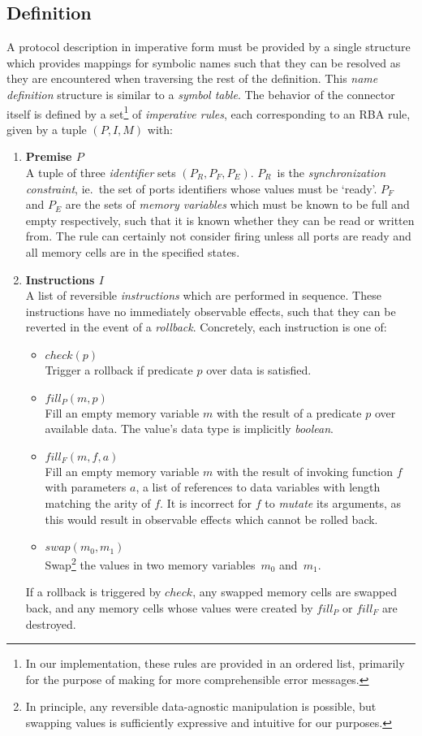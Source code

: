 \subsection{Definition}
\label{sec:imperative_form_definition}
A protocol description in imperative form must be provided by a single structure which provides mappings for symbolic names such that they can be resolved as they are encountered when traversing the rest of the definition. This \textit{name definition} structure is similar to a \textit{symbol table}. The behavior of the connector itself is defined by a set\footnote{In our implementation, these rules are provided in an ordered list, primarily for the purpose of making for more comprehensible error messages.} of \textit{imperative rules}, each corresponding to an RBA rule, given by a tuple $(P, I, M)$ with:
\begin{enumerate}
	\item \textbf{Premise $P$}\\
	A tuple of three \textit{identifier} sets $(P_R, P_F, P_E)$. $P_R$~is the \textit{synchronization constraint}, ie.\ the set of ports identifiers whose values must be `ready'. $P_F$ and $P_E$ are the sets of \textit{memory variables} which must be known to be full and empty respectively, such that it is known whether they can be read or written from. The rule can certainly not consider firing unless all ports are ready and all memory cells are in the specified states.
	
	\item \textbf{Instructions $I$}\\
	A list of reversible \textit{instructions} which are performed in sequence. These instructions have no immediately observable effects, such that they can be reverted in the event of a \textit{rollback}. Concretely, each instruction is one of:
	\begin{itemize}
		\item $check(p)$\\
		Trigger a rollback if predicate $p$ over data is satisfied.
		\item $fill_P(m, p)$\\Fill an empty memory variable $m$ with the result of a predicate $p$ over available data. The value's data type is implicitly \textit{boolean}.
		\item $fill_F(m, f, a)$\\
		Fill an empty memory variable $m$ with the result of invoking function $f$ with parameters $a$, a list of references to data variables with length matching the arity of $f$. It is incorrect for $f$ to \textit{mutate} its arguments, as this would result in observable effects which cannot be rolled back.
		\item $swap(m_0,m_1)$\\
		Swap\footnote{In principle, any reversible data-agnostic manipulation is possible, but swapping values is sufficiently expressive and intuitive for our purposes.} the values in two memory variables~$m_0$ and~$m_1$.
	\end{itemize}
	If a rollback is triggered by $check$, any swapped memory cells are swapped back, and any memory cells whose values were created by $fill_P$ or $fill_F$ are destroyed.
	

\end{enumerate}
